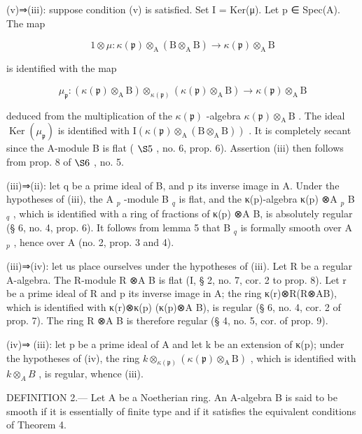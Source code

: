 (v)⇒(iii): suppose condition (v) is satisfied. Set I = Ker(μ). Let p ∈ Spec(A). The map

\[
1 \otimes \mu : \kappa (\mathfrak {p}) \otimes_ {\mathrm{A}} (\mathrm{B} \otimes_ {\mathrm{A}} \mathrm{B}) \rightarrow \kappa (\mathfrak {p}) \otimes_ {\mathrm{A}} \mathrm{B}
\]

is identified with the map

\[
\mu_ {\mathfrak {p}}: (\kappa (\mathfrak {p}) \otimes_ {\mathrm{A}} \mathrm{B}) \otimes_ {\kappa (\mathfrak {p})} (\kappa (\mathfrak {p}) \otimes_ {\mathrm{A}} \mathrm{B}) \rightarrow \kappa (\mathfrak {p}) \otimes_ {\mathrm{A}} \mathrm{B}
\]

deduced from the multiplication of the \(\kappa(\mathfrak{p})\) -algebra \(\kappa(\mathfrak{p})\otimes_{\mathrm{A}}\mathrm{B}\) . The ideal \(\operatorname{Ker}(\mu_{\mathfrak{p}})\) is identified with \(\mathrm{I}(\kappa(\mathfrak{p})\otimes_{\mathrm{A}}(\mathrm{B}\otimes_{\mathrm{A}}\mathrm{B}))\) . It is completely secant since the A-module B is flat ( \(\S 5\) , no. 6, prop. 6). Assertion (iii) then follows from prop. 8 of \(\S 6\) , no. 5.

(iii)⇒(ii): let q be a prime ideal of B, and p its inverse image in A. Under the hypotheses of (iii), the A \(_{p}\) -module B \(_{q}\) is flat, and the κ(p)-algebra κ(p) ⊗A \(_{p}\) B \(_{q}\) , which is identified with a ring of fractions of κ(p) ⊗A B, is absolutely regular (§ 6, no. 4, prop. 6). It follows from lemma 5 that B \(_{q}\) is formally smooth over A \(_{p}\) , hence over A (no. 2, prop. 3 and 4).

(iii)⇒(iv): let us place ourselves under the hypotheses of (iii). Let R be a regular A-algebra. The R-module R ⊗A B is flat (I, § 2, no. 7, cor. 2 to prop. 8). Let r be a prime ideal of R and p its inverse image in A; the ring κ(r)⊗R(R⊗AB), which is identified with κ(r)⊗κ(p) (κ(p)⊗A B), is regular (§ 6, no. 4, cor. 2 of prop. 7). The ring R ⊗A B is therefore regular (§ 4, no. 5, cor. of prop. 9).

(iv)⇒ (iii): let p be a prime ideal of A and let k be an extension of κ(p); under the hypotheses of (iv), the ring \(k \otimes_{\kappa(\mathfrak{p})} (\kappa(\mathfrak{p}) \otimes_{\mathrm{A}} \mathrm{B})\) , which is identified with \(k \otimes_{A} B\) , is regular, whence (iii).

DEFINITION 2.--- Let A be a Noetherian ring. An A-algebra B is said to be smooth if it is essentially of finite type and if it satisfies the equivalent conditions of Theorem 4.

